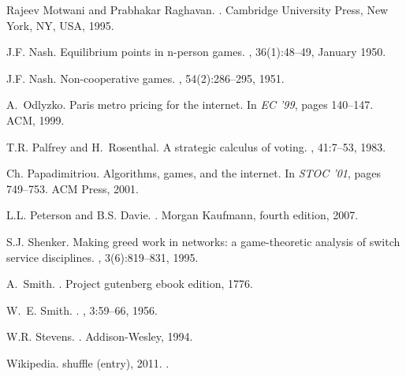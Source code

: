 \documentclass[letterpaper,10pt]{llncs}
\begin{document}
\begin{thebibliography}{1}
Rajeev Motwani and Prabhakar Raghavan.
.
\newblock Cambridge University Press, New York, NY, USA, 1995.

J.F. Nash.
\newblock Equilibrium points in n-person games.
,
  36(1):48--49, January 1950.

J.F. Nash.
\newblock Non-cooperative games.
, 54(2):286--295, 1951.

A.~Odlyzko.
\newblock Paris metro pricing for the internet.
\newblock In {\em EC '99}, pages 140--147. ACM, 1999.

T.R. Palfrey and H.~Rosenthal.
\newblock A strategic calculus of voting.
, 41:7--53, 1983.

Ch. Papadimitriou.
\newblock Algorithms, games, and the internet.
\newblock In {\em STOC '01}, pages 749--753. ACM Press, 2001.

L.L. Peterson and B.S. Davie.
.
\newblock Morgan Kaufmann, fourth edition, 2007.

S.J. Shenker.
\newblock Making greed work in networks: a game-theoretic analysis of switch
  service disciplines.
, 3(6):819--831, 1995.

A.~Smith.
.
\newblock Project gutenberg ebook edition, 1776.

W.~E. Smith.
.
, 3:59--66, 1956.

W.R. Stevens.
.
\newblock Addison-Wesley, 1994.

Wikipedia.
 shuffle (entry), 2011.
.

\end{thebibliography}
\end{document}
